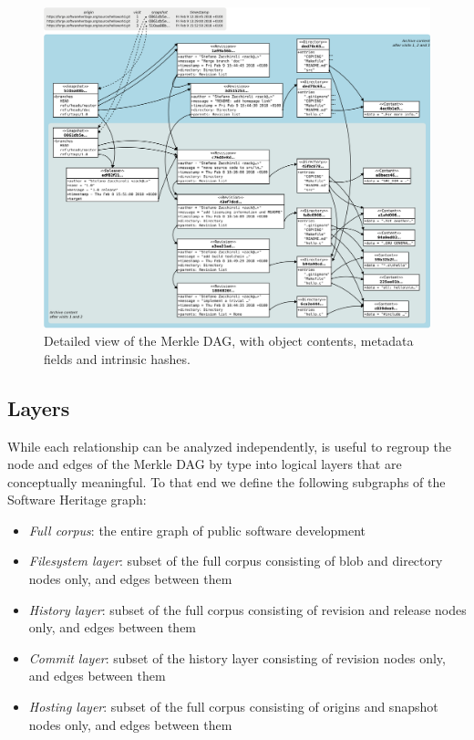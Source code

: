 \begin{figure}
    \centering
    \includegraphics[width=\textwidth]{img/swh-merkle-dag}
    \caption{Detailed view of the Merkle \gls{DAG}, with object contents,
    metadata fields and intrinsic hashes.}%
\end{figure}

\subsection{Layers}
\label{sec:layers}

While each relationship can be analyzed independently, is useful to regroup
the node and edges of the Merkle \gls{DAG} by type into logical layers that are
conceptually meaningful.  To that end we define the following subgraphs of the
Software Heritage graph:
\begin{itemize}

\item \emph{Full corpus}: the entire graph of public software development

\item \emph{Filesystem layer}: subset of the full corpus consisting of blob and
  directory nodes only, and edges between them

\item \emph{History layer}: subset of the full corpus consisting of revision and
  release nodes only, and edges between them

\item \emph{Commit layer}: subset of the history layer consisting of revision
  nodes only, and edges between them

\item \emph{Hosting layer}: subset of the full corpus consisting of origins and
  snapshot nodes only, and edges between them

\end{itemize}

